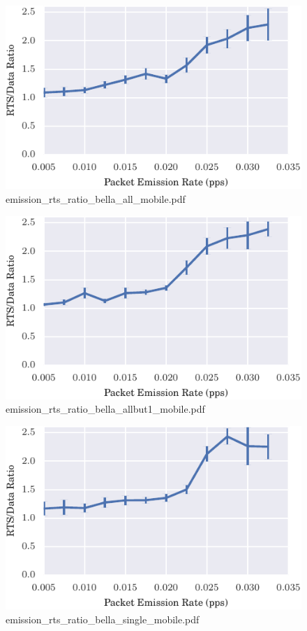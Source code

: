 \documentclass{article}
\begin{document}
\begin{figure}[h!]
\centering
\includegraphics[width=\linewidth]{emission_rts_ratio_bella_all_mobile.pdf}
\caption{emission\_rts\_ratio\_bella\_all\_mobile.pdf}
\end{figure}




\begin{figure}[h!]
\centering
\includegraphics[width=\linewidth]{emission_rts_ratio_bella_allbut1_mobile.pdf}
\caption{emission\_rts\_ratio\_bella\_allbut1\_mobile.pdf}
\end{figure}




\begin{figure}[h!]
\centering
\includegraphics[width=\linewidth]{emission_rts_ratio_bella_single_mobile.pdf}
\caption{emission\_rts\_ratio\_bella\_single\_mobile.pdf}
\end{figure}
\end{document}
